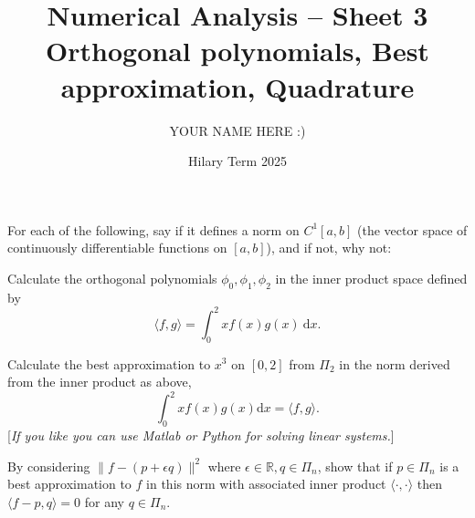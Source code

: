 \documentclass[answers]{exam}
\title{Numerical Analysis -- Sheet 3\\Orthogonal polynomials, Best approximation, Quadrature}
\author{YOUR NAME HERE :)}
\date{Hilary Term 2025}
\begin{document}
\maketitle

\begin{questions}

\question%
For each of the following, say if it defines a norm on $C^{1}[a, b]$ (the vector space of continuously differentiable functions on $[a, b]$), and if not, why not:



\question%
Calculate the orthogonal polynomials $\phi_{0}, \phi_{1}, \phi_{2}$ in the inner product space defined by \[
	\langle f, g\rangle=\int_{0}^{2} x f(x) g(x)~ \mathrm{d} x.
\]



\question%
Calculate the best approximation to $x^{3}$ on $[0,2]$ from $\Pi_{2}$ in the norm derived from the inner product as above, \[
	\int_{0}^{2} x f(x) g(x) \mathrm{d} x=\langle f, g\rangle .
\] [\emph{If you like you can use Matlab or Python for solving linear systems.}]



\question%
By considering $\|f-(p+\epsilon q)\|^{2}$ where $\epsilon \in \mathbb{R}, q \in \Pi_{n}$, show that if $p \in \Pi_{n}$ is a best approximation to $f$ in this norm with associated inner product $\langle\cdot, \cdot\rangle$ then $\langle f-p, q\rangle=0$ for any $q \in \Pi_{n}$.




\end{questions}
\end{document}
